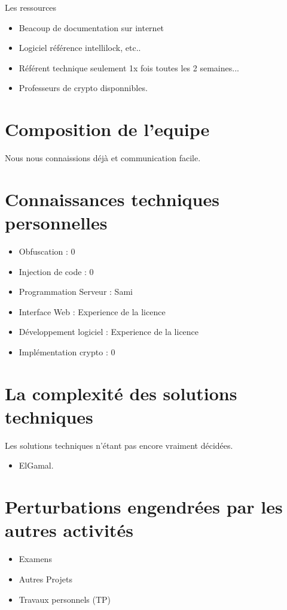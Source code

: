Les ressources
\begin{itemize}
	\item Beacoup de documentation sur internet
	\item Logiciel référence intellilock, etc..
	\item Référent technique seulement 1x fois toutes les 2 semaines...
	\item Professeurs de crypto disponnibles.\newline
\end{itemize}

\section{Composition de l'equipe}
Nous nous connaissions déjà et communication facile.

\section{Connaissances techniques personnelles}
\begin{itemize}
	\item Obfuscation : 0
	\item Injection de code : 0
	\item Programmation Serveur : Sami
	\item Interface Web : Experience de la licence 
	\item Développement logiciel : Experience de la licence
	\item Implémentation crypto : 0
\end{itemize}

\section{La complexité des solutions techniques}
Les solutions techniques n'étant pas encore vraiment décidées.
\begin{itemize}
	\item ElGamal.
\end{itemize}

\section{Perturbations engendrées par les autres activités}
\begin{itemize}
	\item Examens
	\item Autres Projets
	\item Travaux personnels (TP)
\end{itemize}

